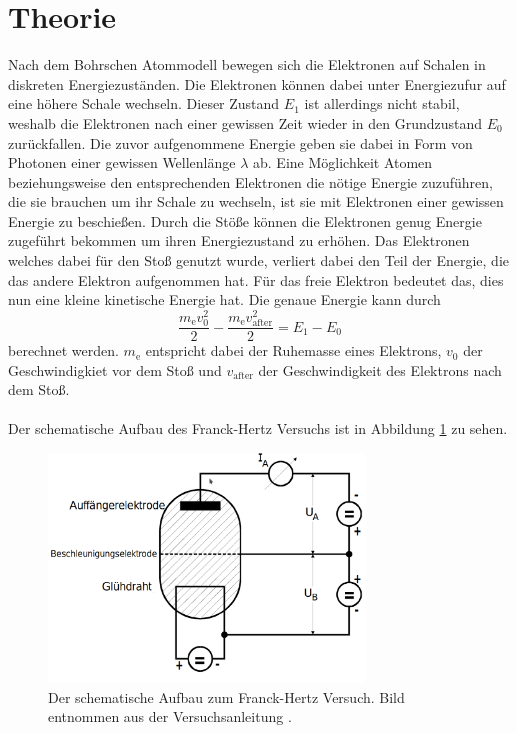 \section{Theorie}
\label{sec:Theorie}
Nach dem Bohrschen Atommodell bewegen sich die Elektronen auf Schalen in diskreten Energiezuständen.
Die Elektronen können dabei unter Energiezufur auf eine höhere Schale wechseln.
Dieser Zustand $E_1$ ist allerdings nicht stabil, weshalb die Elektronen nach einer gewissen Zeit wieder in den Grundzustand $E_0$ zurückfallen.
Die zuvor aufgenommene Energie geben sie dabei in Form von Photonen einer gewissen Wellenlänge $\lambda$ ab.
Eine Möglichkeit Atomen beziehungsweise den entsprechenden Elektronen die nötige Energie zuzuführen, die sie brauchen um ihr Schale zu wechseln, ist sie mit Elektronen einer gewissen Energie zu beschießen.
Durch die Stöße können die Elektronen genug Energie zugeführt bekommen um ihren Energiezustand zu erhöhen.
Das Elektronen welches dabei für den Stoß genutzt wurde, verliert dabei den Teil der Energie, die das andere Elektron aufgenommen hat.
Für das freie Elektron bedeutet das, dies nun eine kleine kinetische Energie hat.
Die genaue Energie kann durch 
\begin{equation*}
    \frac{m_\text{e} v_0^2}{2} - \frac{m_\text{e}v_\text{after}^2}{2} = E_1 - E_0
\end{equation*} 
berechnet werden. $m_\text{e}$ entspricht dabei der Ruhemasse eines Elektrons, $v_0$ der Geschwindigkiet vor dem Stoß und $v_\text{after}$ der Geschwindigkeit des Elektrons nach dem Stoß.
\\\\
Der schematische Aufbau des Franck-Hertz Versuchs ist in Abbildung \ref{fig:schematischeraufbau} zu sehen.
\begin{figure}
    \centering
    \includegraphics[width=0.75\textwidth]{content/data/schematischeraufbau.png}
    \caption{Der schematische Aufbau zum Franck-Hertz Versuch. Bild entnommen aus der Versuchsanleitung \cite[2]{anleitung}.}
    \label{fig:schematischeraufbau}
\end{figure}
